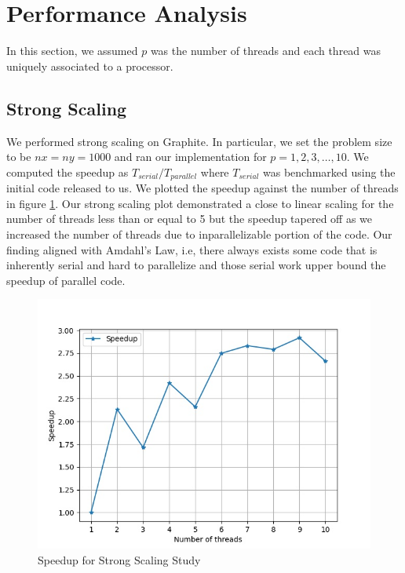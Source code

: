 \documentclass{article}
\begin{document}

\section{Performance Analysis}
In this section, we assumed $p$ was the number of threads and each thread was uniquely associated to a processor.

\subsection{Strong Scaling}
\label{sec: strong_scaling}
We performed strong scaling on Graphite. In particular, we set the problem size to be $nx = ny = 1000$ and ran our implementation for $p = 1, 2, 3, \ldots, 10$. 
We computed the speedup as $T_{serial} / T_{parallel}$ where $T_{serial}$ was benchmarked using the initial code released to us. 
We plotted the speedup against the number of threads in figure \ref{fig:strong_scaling}. 
Our strong scaling plot demonstrated a close to linear scaling for the number of threads less than or equal to 5 but the speedup tapered off 
as we increased the number of threads due to inparallelizable portion of the code.
Our finding aligned with Amdahl’s Law, i.e, there always exists some code that is inherently serial and hard to parallelize and those serial work upper bound the speedup of parallel code.

\begin{figure}[h!]
	\centering
	\includegraphics[width=0.8\columnwidth]{../strong_scaling.jpg}
	\caption{Speedup for Strong Scaling Study}
	\label{fig:strong_scaling}
\end{figure}
\end{document}
